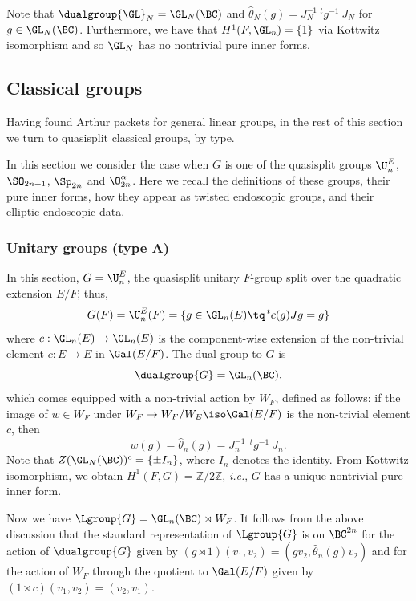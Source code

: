 \documentclass[11pt,letterpaper]{amsart}
\numberwithin{equation}{section}
\begin{document}
Note that $\dualgroup{\GL}_N=\GL_N(\BC)$ and $\hat\theta_N(g)=J_N^{-1}\ {}^tg^{-1}\ J_N$ for $g\in\GL_N(\BC)$. 
Furthermore, we have that $H^1(F,\GL_n)=\{1\}$ via Kottwitz isomorphism and so $\GL_N$ has no nontrivial pure inner forms.

\subsection{Classical groups}\label{subsection: classical groups}


Having found Arthur packets for general linear groups, in the rest of this section we turn to quasisplit classical groups, by type. 

In this section we consider the case when $G$ is one of the quasisplit groups $\U^E_n$, $\SO_{2n+1}$, $\Sp_{2n}$ and $\O^{\alpha}_{2n}$. 
Here we recall the definitions of these groups, their pure inner forms, how they appear as twisted endoscopic groups, and their elliptic endoscopic data.

\subsubsection{Unitary groups (type A)}
\label{subsubsection: A}

In this section, $G = \U^E_n$, the quasisplit unitary $F$-group split over the quadratic extension $E/F$; thus,
\[
G(F) = \U^{E}_n(F) = \{ g\in \GL_n(E) \tq \,^tc(g) J g = g\}
\]
where $c : \GL_n(E) \to \GL_n(E)$ is the component-wise extension of the non-trivial element $c : E\to E$ in $\Gal(E/F)$.
The dual group to $G$ is 
\[
\dualgroup{G}= \GL_n(\BC),
\]
which comes equipped with a non-trivial action by $W_F$, defined as follows: 
if the image of $w\in W_F$ under $W_F \to W_F/W_E \iso \Gal(E/F)$ is the non-trivial element $c$, then
\begin{equation}\label{equation: theta A}
w(g) = {\hat\theta}_n(g) = J_n^{-1}\ \,^tg^{-1}\ J_n. 
\end{equation}
Note that $Z(\GL_N(\BC))^{c}=\{\pm I_{n}\}$, where $I_n$ denotes the identity. From Kottwitz isomorphism, we obtain $H^1(F,G)=\mathbb{Z}/2\mathbb{Z}$, {\it i.e.}, $G$ has a unique nontrivial pure inner form.

Now we have
$\Lgroup{G} = \GL_n(\BC) \rtimes W_F$.
It follows from the above discussion that the standard representation of $\Lgroup{G}$ is on $\BC^{2n}$ for the action of $\dualgroup{G}$ given by
$
(g\rtimes 1)(v_1,v_2) = (gv_2,{\hat\theta_n}(g)v_2)
$
and for the action of $W_F$ through the quotient to $\Gal(E/F)$ given by
$
(1\rtimes c)(v_1,v_2) = (v_2,v_1).
$
\end{document}
